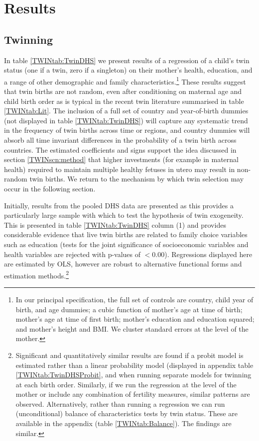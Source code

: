\section{Results}                                  \label{TWINscn:results}
\subsection{Twinning}                              \label{TWINsscn:twinning}
In table \ref{TWINtab:TwinDHS} we present results of a regression of a child's 
twin status (one if a twin, zero if a singleton) on their mother's health, 
education, and a range of other demographic and family characteristics.\footnote{
In our principal specification, the full set of controls are country, child year 
of birth, and age dummies; a cubic function of mother's age at time of birth; 
mother's age at time of first birth; mother's education and education squared; 
and mother's height and BMI. We cluster standard errors at the level of the 
mother.}  These results suggest that twin births are not random, even after 
conditioning on maternal age and child birth order as is typical in the recent 
twin literature summarised in table \ref{TWINtab:Lit}. The inclusion of a full 
set of country and year-of-birth dummies (not displayed in table 
\ref{TWINtab:TwinDHS}) will capture any systematic trend in the frequency of 
twin births across time or regions, and country dummies will absorb all time 
invariant differences in the probability of a twin birth across countries. The 
estimated coefficients and signs support the idea discussed in section 
\ref{TWINscn:method} that higher investments (for example in maternal health) 
required to maintain multiple healthy fetuses in utero may result in non-random 
twin births. We return to the mechanism by which twin selection may occur in 
the following section.

Initially, results from the pooled DHS data are presented as this provides a 
particularly large sample with which to test the hypothesis of twin exogeneity. 
This is presented in table \ref{TWINtab:TwinDHS} column (1) and provides 
considerable evidence that live twin births are related to family choice 
variables such as education (tests for the joint significance of socioeconomic 
variables and health variables are rejected with p-values of $<$0.00).  
Regressions displayed here are estimated by OLS, however are robust to 
alternative functional forms and estimation methods.\footnote{Significant and 
quantitatively similar results are found if a probit model is estimated rather 
than a linear probability model (displayed in appendix table 
\ref{TWINtab:TwinDHSProbit}, and when running separate models for twinning at 
each birth order. Similarly, if we run the regression at the level of the mother 
or include any combination of fertility measures, similar patterns are observed.
Alternatively, rather than running a regression we can run (unconditional) 
balance of characteristics tests by twin status.  These are available in the 
appendix (table \ref{TWINtab:Balance}).  The findings are similar.}

